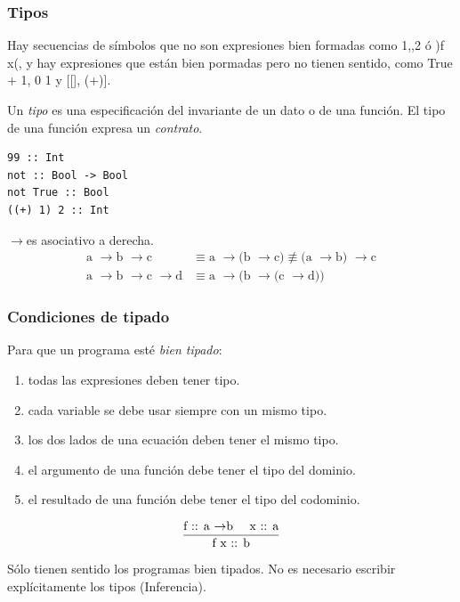 \documentclass[12pt]{extarticle}
\def\flecha{$\rightarrow$}
\def\ssspace{\space\space\space}
\begin{document}
\subsubsection{Tipos}
Hay secuencias de símbolos  que no son expresiones bien formadas como 1,,2 ó )f x(, y hay expresiones que están bien pormadas pero no tienen sentido, como True + 1, 0 1 y [[], (+)].

Un \textit{tipo} es una especificación del invariante de un dato o de una función. El tipo de una función expresa un \textit{contrato}.

\begin{verbatim}
99 :: Int
not :: Bool -> Bool
not True :: Bool
((+) 1) 2 :: Int
\end{verbatim}

\flecha es asociativo a derecha.
\begin{equation}
\begin{split}
\text{a \flecha b \flecha c} & \equiv \text{a \flecha (b \flecha c)} 
\not\equiv \text{(a \flecha b) \flecha c} \\
\text{a \flecha b \flecha c \flecha d} & \equiv \text{a \flecha (b \flecha (c \flecha d))}
\end{split}
\end{equation}

\subsubsection{Condiciones de tipado}
Para que un programa esté \textit{bien tipado}:

\begin{enumerate}
\itemsep-0.35em 
\item todas las expresiones deben tener tipo.
\item cada variable se debe usar siempre con un mismo tipo.
\item los dos lados de una ecuación deben tener el mismo tipo.
\item el argumento de una función debe tener el tipo del dominio.
\item el resultado de una función debe tener el tipo del codominio.
\end{enumerate}

\begin{equation}
\frac{\text{f :: a \flecha b \ssspace x :: a}}{\text{f x :: b}}
\end{equation}

Sólo tienen sentido los programas bien tipados.
No es necesario escribir explícitamente los tipos (Inferencia).
\end{document}
